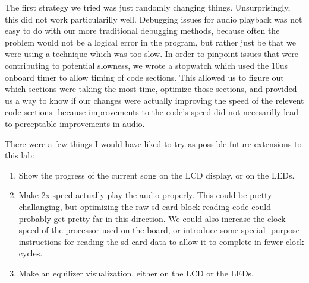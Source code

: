 \documentclass[12pt]{article}
\begin{document}

The first strategy we tried was just randomly changing things. Unsurprisingly,
this did not work particularilly well. Debugging issues for audio playback
was not easy to do with our more traditional debugging methods, because often
the problem would not be a logical error in the program, but rather just be
that we were using a technique which was too slow. In order to pinpoint issues
that were contributing to potential slowness, we wrote a stopwatch which used
the 10us onboard timer to allow timing of code sections. This allowed us to
figure out which sections were taking the most time, optimize those sections,
and provided us a way to know if our changes were actually improving the speed
of the relevent code sections- because improvements to the code's speed did
not necesarilly lead to perceptable improvements in audio.

There were a few things I would have liked to try as possible future extensions
to this lab:
\begin{enumerate}
\item Show the progress of the current song on the LCD display, or on the LEDs.
\item Make 2x speed actually play the audio properly. This could be pretty
	challanging, but optimizing the raw sd card block reading code could
	probably get pretty far in this direction. We could also increase the
	clock speed of the processor used on the board, or introduce some special-
	purpose instructions for reading the sd card data to allow it to complete
	in fewer clock cycles.
\item Make an equilizer visualization, either on the LCD or the LEDs.
\end{enumerate}


\end{document}
